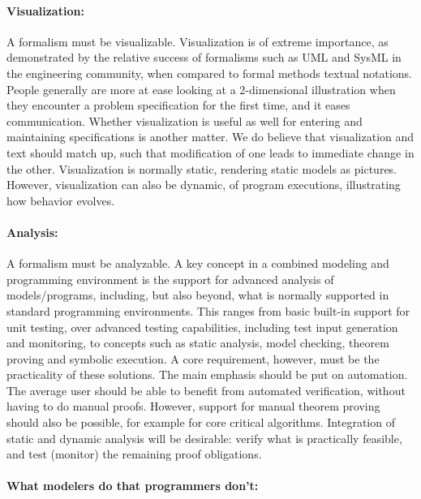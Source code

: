 \paragraph{Visualization:}

A formalism must be visualizable.
Visualization is of extreme importance, as demonstrated by the 
relative success of formalisms such as UML and SysML in the 
engineering community, when compared 
to formal methods textual notations. People generally are more at 
ease looking at a 2-dimensional illustration when they encounter a 
problem specification for the first
time, and it eases communication. Whether visualization is useful 
as well for entering
and maintaining specifications is another matter. We do believe 
that visualization and 
text should match up, such that modification of one leads to 
immediate change in the 
other. Visualization is normally static, rendering static models as
pictures. However, visualization can also be dynamic, of program 
executions, illustrating how behavior evolves.

\paragraph{Analysis:}

A formalism must be analyzable.
A key concept in a combined modeling and programming environment is 
the support for advanced analysis of models/programs, including, 
but also beyond, what is normally supported in standard programming 
environments. This ranges from basic built-in support for unit 
testing, over advanced testing capabilities, including test input 
generation and monitoring, to concepts such as static analysis, 
model checking, theorem proving and symbolic execution. A core 
requirement, however, must be the practicality of these solutions. 
The main emphasis should be put on automation. The average user 
should be able to benefit from automated verification, without 
having to do manual proofs. However, support for manual theorem 
proving should also be possible, for example for core critical 
algorithms. Integration of static and dynamic analysis will be 
desirable: verify what is practically feasible, and test (monitor) 
the remaining proof obligations.

\paragraph{What modelers do that programmers don't:}

